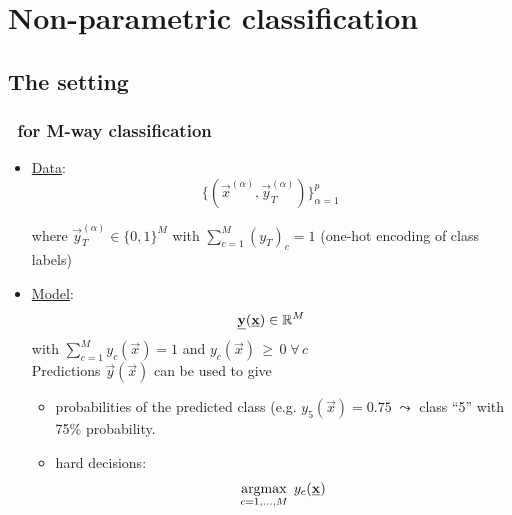 
\section{Non-parametric classification}

\subsection{The setting}

\begin{frame}\frametitle{\subsecname~for M-way classification}


\begin{itemize}
	\item[]\underline{Data}:
	\begin{equation*}
	\Big\{ \left(\vec x^{(\alpha)}, \vec y^{(\alpha)}_{T} \right) \Big\}_{\alpha=1}^{p}\,
	\end{equation*}

	where $\vec y_T^{(\alpha)} \in \{0, 1\}^M$ with $\sum_{c=1}^{M} (y_{T})_c = 1$ (one-hot encoding of class labels)\\

	\pause

	\item[]\underline{Model}:
	\begin{equation*}
	\underline{\mathbf{y}}(\underline{\mathbf{x}}) \in \mathbb{R}^M 
	\end{equation*}
	with $\sum_{c=1}^{M} y_c(\vec x) = 1$ and $y_c(\vec x)\,\ge\,0\; \forall\,c$\\[2mm]
	
	Predictions $\vec y(\vec x)$ can be used to give
	\begin{itemize}
	\item probabilities of the predicted class (e.g. $y_5(\vec x) = 0.75\; \leadsto$ class ``5'' with 75\% probability.
	\item hard decisions:
    \begin{equation}
    \argmax_{c=1,\ldots,M}\;y_c(\vec x)
    \end{equation}
	\end{itemize}

\end{itemize}

\end{frame}

